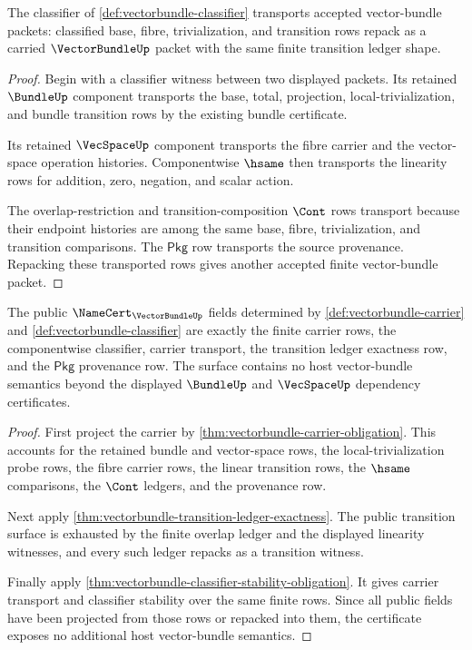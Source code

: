 \begin{theorem}
\label{thm:vectorbundle-classifier-stability-obligation}
The classifier of \autoref{def:vectorbundle-classifier} transports accepted
vector-bundle packets: classified base, fibre, trivialization, and transition
rows repack as a carried $\VectorBundleUp$ packet with the same finite
transition ledger shape.
\end{theorem}
\begin{proof}
Begin with a classifier witness between two displayed packets. Its retained
$\BundleUp$ component transports the base, total, projection,
local-trivialization, and bundle transition rows by the existing bundle
certificate.

Its retained $\VecSpaceUp$ component transports the fibre carrier and the
vector-space operation histories. Componentwise $\hsame$ then transports the
linearity rows for addition, zero, negation, and scalar action.

The overlap-restriction and transition-composition $\Cont$ rows transport
because their endpoint histories are among the same base, fibre,
trivialization, and transition comparisons. The $\mathsf{Pkg}$ row transports
the source provenance. Repacking these transported rows gives another accepted
finite vector-bundle packet.
\end{proof}

\begin{theorem}
\label{thm:vectorbundle-namecert-obligation-surface}
The public $\NameCert_{\VectorBundleUp}$ fields determined by
\autoref{def:vectorbundle-carrier} and
\autoref{def:vectorbundle-classifier} are exactly the finite carrier rows, the
componentwise classifier, carrier transport, the transition ledger exactness
row, and the $\mathsf{Pkg}$ provenance row. The surface contains no host
vector-bundle semantics beyond the displayed $\BundleUp$ and $\VecSpaceUp$
dependency certificates.
\end{theorem}
\begin{proof}
First project the carrier by
\autoref{thm:vectorbundle-carrier-obligation}. This accounts for the retained
bundle and vector-space rows, the local-trivialization probe rows, the fibre
carrier rows, the linear transition rows, the $\hsame$ comparisons, the
$\Cont$ ledgers, and the provenance row.

Next apply
\autoref{thm:vectorbundle-transition-ledger-exactness}. The public transition
surface is exhausted by the finite overlap ledger and the displayed linearity
witnesses, and every such ledger repacks as a transition witness.

Finally apply
\autoref{thm:vectorbundle-classifier-stability-obligation}. It gives carrier
transport and classifier stability over the same finite rows. Since all public
fields have been projected from those rows or repacked into them, the
certificate exposes no additional host vector-bundle semantics.
\end{proof}

